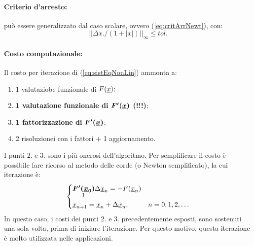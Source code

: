 \paragraph{Criterio d'arresto:} può essere generalizzato dal caso scalare, ovvero (\ref{eq:critArrNewt}), con:
\begin{equation}
    ||\Delta x.\slash(1+|x|)||_\infty\leq tol.
\end{equation}

\paragraph{Costo computazionale:} Il costo per iterazione di (\ref{eq:sistEqNonLin}) ammonta a:
\begin{enumerate}
    \item 1 valutaziobe funzionale di $F(\uline x);$
    \item \textbf{1 valutazione funzionale di $\boldsymbol{F'(\uline x)}$ (!!!)};
    \item \textbf{1 fattorizzazione di} $\boldsymbol{F'(\uline x)}$;
    \item 2 risoluzionei con i fattori + 1 aggiornamento.
\end{enumerate}
I punti 2. e 3. sono i più onerosi dell'algoritmo. Per semplificare il costo è possibile fare ricorso al metodo delle corde (o Newton semplificato), la cui iterazione è:
\begin{equation*}
    \begin{cases}
        \underset{\footnotemark}{\boldsymbol{F'(\uline x_0)}}\Delta\uline x_n = - F(\uline x_n)\\
        \uline x_{n+1} = \uline x_n + \Delta\uline x_n, & n=0,1,2,\hdots
    \end{cases}
\end{equation*}
In questo caso, i costi dei punti 2. e 3. precedentemente esposti, sono sostenuti una sola volta, prima di iniziare l'iterazione. Per questo motivo, questa iterazione è molto utilizzata nelle applicazioni.

